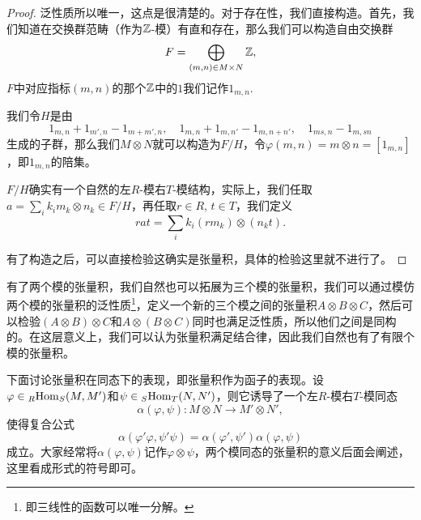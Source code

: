 \begin{proof} 


泛性质所以唯一，这点是很清楚的。对于存在性，我们直接构造。首先，我们知道在交换群范畴（作为$\mathbb{Z}$-模）有直和存在，那么我们可以构造自由交换群
\[
	F=\bigoplus_{(m,n)\in M\times N} \mathbb{Z},
\]
$F$中对应指标$(m,n)$的那个$\mathbb{Z}$中的$1$我们记作$1_{m,n}$. 

我们令$H$是由
\[
	1_{m,n}+1_{m',n}-1_{m+m',n},\quad 1_{m,n}+1_{m,n'}-1_{m,n+n'},\quad 1_{ms,n}-1_{m,sn}
\]
生成的子群，那么我们$M\otimes N$就可以构造为$F/H$，令$\varphi(m,n)=m\otimes n=[1_{m,n}]$，即$1_{m,n}$的陪集。

$F/H$确实有一个自然的左$R$-模右$T$-模结构，实际上，我们任取$a=\sum_{i}k_i m_k\otimes n_k \in F/H$，再任取$r\in R$, $t\in T$，我们定义
\[
	rat=\sum_{i}k_i (rm_k)\otimes (n_kt).
\]

有了构造之后，可以直接检验这确实是张量积，具体的检验这里就不进行了。
\end{proof}

\para 有了两个模的张量积，我们自然也可以拓展为三个模的张量积，我们可以通过模仿两个模的张量积的泛性质\footnote{即三线性的函数可以唯一分解。}，定义一个新的三个模之间的张量积$A\otimes B\otimes C$，然后可以检验$(A\otimes B)\otimes C$和$A\otimes (B\otimes C)$同时也满足泛性质，所以他们之间是同构的。在这层意义上，我们可以认为张量积满足结合律，因此我们自然也有了有限个模的张量积。

\para 下面讨论张量积在同态下的表现，即张量积作为函子的表现。设$\varphi\in {}_R\!\operatorname{Hom}_S(M,M')$和$\psi\in {}_S\!\operatorname{Hom}_T(N,N')$，则它诱导了一个左$R$-模右$T$-模同态
\[
	\alpha(\varphi,\psi):M\otimes N\to M'\otimes N',
\]
使得复合公式
\[
	\alpha(\varphi'\varphi,\psi'\psi)=\alpha(\varphi',\psi')\alpha(\varphi,\psi)
\]
成立。大家经常将$\alpha(\varphi,\psi)$记作$\varphi\otimes \psi$，两个模同态的张量积的意义后面会阐述，这里看成形式的符号即可。

